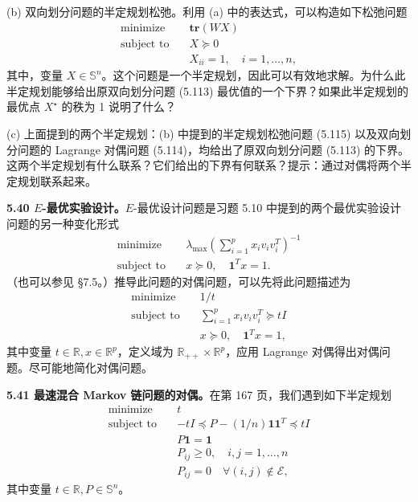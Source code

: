 \documentclass[UTF8,12pt,a4paper,fontset=fandol]{ctexart}
\begin{document}
(b) 双向划分问题的半定规划松弛。利用 (a) 中的表达式，可以构造如下松弛问题
\begin{equation}
\begin{aligned}
\text{minimize}\quad & \mathbf{tr}(WX)\\
\text{subject to}\quad & X\succeq 0\\
& X_{ii}=1,\quad i=1,\ldots,n,
\end{aligned}
\tag{5.115}
\end{equation}
其中，变量 $X\in\mathbb{S}^n$。这个问题是一个半定规划，因此可以有效地求解。为什么此半定规划能够给出原双向划分问题 (5.113) 最优值的一个下界？如果此半定规划的最优点 $X^\star$ 的秩为 1 说明了什么？

(c) 上面提到的两个半定规划：(b) 中提到的半定规划松弛问题 (5.115) 以及双向划分问题的 Lagrange 对偶问题 (5.114)，均给出了原双向划分问题 (5.113) 的下界。这两个半定规划有什么联系？它们给出的下界有何联系？提示：通过对偶将两个半定规划联系起来。

\noindent\textbf{5.40 $E$-最优实验设计。}\quad $E$-最优设计问题是习题 5.10 中提到的两个最优实验设计问题的另一种变化形式
\[
\begin{aligned}
\text{minimize}\quad & \lambda_{\max}\left(\sum_{i=1}^p x_iv_iv_i^T\right)^{-1}\\
\text{subject to}\quad & x\succeq 0,\quad \mathbf{1}^Tx=1.
\end{aligned}
\]
（也可以参见 §7.5。）推导此问题的对偶问题，可以先将此问题描述为
\[
\begin{aligned}
\text{minimize}\quad & 1/t\\
\text{subject to}\quad & \sum_{i=1}^p x_iv_iv_i^T\succeq tI\\
& x\succeq 0,\quad \mathbf{1}^Tx=1,
\end{aligned}
\]
其中变量 $t\in\mathbb{R}, x\in\mathbb{R}^p$，定义域为 $\mathbb{R}_{++}\times\mathbb{R}^p$，应用 Lagrange 对偶得出对偶问题。尽可能地简化对偶问题。

\noindent\textbf{5.41 最速混合 Markov 链问题的对偶。}\quad 在第 167 页，我们遇到如下半定规划
\[
\begin{aligned}
\text{minimize}\quad & t\\
\text{subject to}\quad & -tI\preceq P-(1/n)\mathbf{1}\mathbf{1}^T\preceq tI\\
& P\mathbf{1}=\mathbf{1}\\
& P_{ij}\geq 0,\quad i,j=1,\ldots,n\\
& P_{ij}=0\quad \forall (i,j)\notin\mathcal{E},
\end{aligned}
\]
其中变量 $t\in\mathbb{R}, P\in\mathbb{S}^n$。
\end{document}
